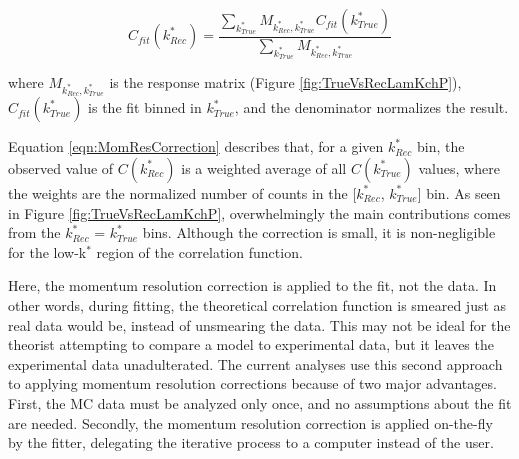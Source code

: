 \documentclass[../AnalysisNoteJBuxton.tex]{subfiles}
\begin{document}
\begin{equation}
  C_{fit}(k^{*}_{Rec}) = \dfrac{\sum\limits_{k^{*}_{True}}M_{k^{*}_{Rec},k^{*}_{True}}C_{fit}(k^{*}_{True})}{\sum\limits_{k^{*}_{True}}M_{k^{*}_{Rec},k^{*}_{True}}}
\label{eqn:MomResCorrection}
\end{equation}

where $M_{k^{*}_{Rec},k^{*}_{True}}$ is the response matrix (Figure \ref{fig:TrueVsRecLamKchP}), $C_{fit}(k^{*}_{True})$ is the fit binned in $k^{*}_{True}$, and the denominator normalizes the result.

Equation \ref{eqn:MomResCorrection} describes that, for a given $k^{*}_{Rec}$ bin, the observed value of $C(k^{*}_{Rec})$ is a weighted average of all $C(k^{*}_{True})$ values, where the weights are the normalized number of counts in the [$k^{*}_{Rec}$, $k^{*}_{True}$] bin.
As seen in Figure \ref{fig:TrueVsRecLamKchP}, overwhelmingly the main contributions comes from the $k^{*}_{Rec}$ = $k^{*}_{True}$ bins.
Although the correction is small, it is non-negligible for the low-k$^{*}$ region of the correlation function.

Here, the momentum resolution correction is applied to the fit, not the data.
In other words, during fitting, the theoretical correlation function is smeared just as real data would be, instead of unsmearing the data.
This may not be ideal for the theorist attempting to compare a model to experimental data, but it leaves the experimental data unadulterated.
The current analyses use this second approach to applying momentum resolution corrections because of two major advantages.  First, the MC data must be analyzed only once, and no assumptions about the fit are needed.  Secondly, the momentum resolution correction is applied on-the-fly by the fitter, delegating the iterative process to a computer instead of the user.
\end{document}
